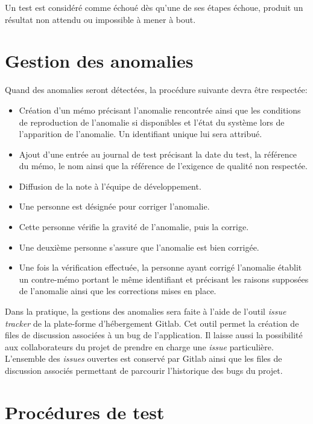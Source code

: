 \documentclass{../res/univ-projet}
\begin{document}
Un test est considéré comme échoué dès qu'une de ses étapes échoue, produit un résultat non attendu ou impossible à mener à bout.


\section{Gestion des anomalies}

Quand des anomalies seront détectées, la procédure suivante devra être respectée:
  \begin{itemize}
   \item Création d'un mémo précisant l'anomalie rencontrée ainsi que les conditions de reproduction de l'anomalie si disponibles et l'état du système lors de l'apparition de l'anomalie.  
   Un identifiant unique lui sera attribué.
   \item Ajout d'une entrée au journal de test précisant la date du test, la référence du mémo, le nom ainsi que la référence de l'exigence de 
   qualité non respectée.
   \item Diffusion de la note à l'équipe de développement.
   \item Une personne est désignée pour corriger l'anomalie.
   \item Cette personne vérifie la gravité de l'anomalie, puis la corrige.
   \item Une deuxième personne s'assure que l'anomalie est bien corrigée.
   \item Une fois la vérification effectuée, la personne ayant corrigé l'anomalie établit un contre-mémo portant le même identifiant et précisant les raisons supposées 
   de l'anomalie ainsi que les corrections mises en place.
  \end{itemize}
  

  Dans la pratique, la gestions des anomalies sera faite à l'aide de l'outil \emph{issue tracker} de
  la plate-forme d'hébergement Gitlab. Cet outil permet la création de files de discussion associées à un bug
  de l'application. Il laisse aussi la possibilité aux collaborateurs du projet de prendre en charge 
  une \emph{issue} particulière. L'ensemble des \emph{issues} ouvertes est conservé par Gitlab ainsi
  que les files de discussion associés permettant de parcourir l'historique des bugs du projet.


\section{Procédures de test}
\end{document}
